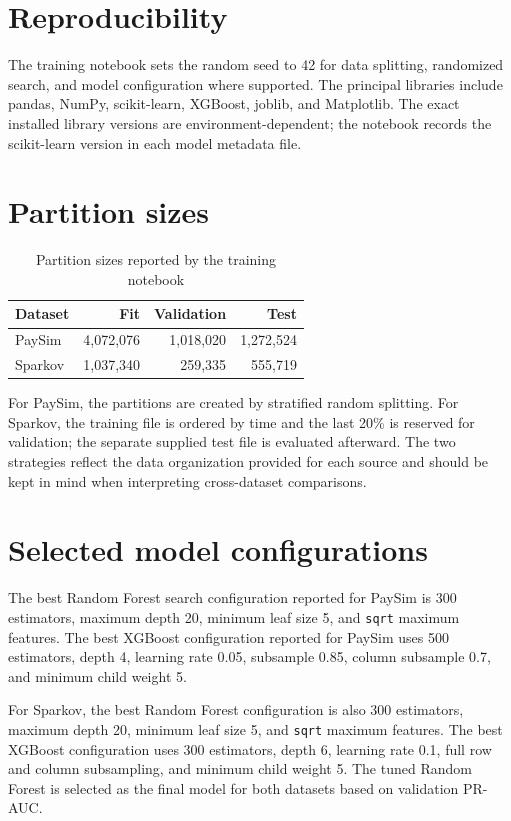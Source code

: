 \documentclass[12pt,a4paper]{report}
\begin{document}
\section{Reproducibility}
The training notebook sets the random seed to 42 for data splitting, randomized search, and model configuration where supported. The principal libraries include pandas, NumPy, scikit-learn, XGBoost, joblib, and Matplotlib. The exact installed library versions are environment-dependent; the notebook records the scikit-learn version in each model metadata file.

\section{Partition sizes}
\begin{table}[H]
\centering
\caption{Partition sizes reported by the training notebook}
\begin{tabular}{lrrr}
\toprule
\textbf{Dataset} & \textbf{Fit} & \textbf{Validation} & \textbf{Test}\\
\midrule
PaySim & 4,072,076 & 1,018,020 & 1,272,524\\
Sparkov & 1,037,340 & 259,335 & 555,719\\
\bottomrule
\end{tabular}
\end{table}

For PaySim, the partitions are created by stratified random splitting. For Sparkov, the training file is ordered by time and the last 20\% is reserved for validation; the separate supplied test file is evaluated afterward. The two strategies reflect the data organization provided for each source and should be kept in mind when interpreting cross-dataset comparisons.

\section{Selected model configurations}
The best Random Forest search configuration reported for PaySim is 300 estimators, maximum depth 20, minimum leaf size 5, and \texttt{sqrt} maximum features. The best XGBoost configuration reported for PaySim uses 500 estimators, depth 4, learning rate 0.05, subsample 0.85, column subsample 0.7, and minimum child weight 5.

For Sparkov, the best Random Forest configuration is also 300 estimators, maximum depth 20, minimum leaf size 5, and \texttt{sqrt} maximum features. The best XGBoost configuration uses 300 estimators, depth 6, learning rate 0.1, full row and column subsampling, and minimum child weight 5. The tuned Random Forest is selected as the final model for both datasets based on validation PR-AUC.
\end{document}
